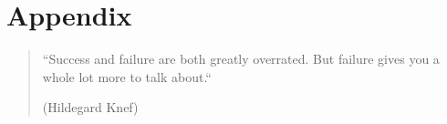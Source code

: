 \chapter{Appendix\label{appendix_A}}

\begin{quotation}
``Success and failure are both greatly overrated. But failure gives you a whole lot more to talk about.``
\begin{flushright}
(Hildegard Knef)
\end{flushright}
\end{quotation}
